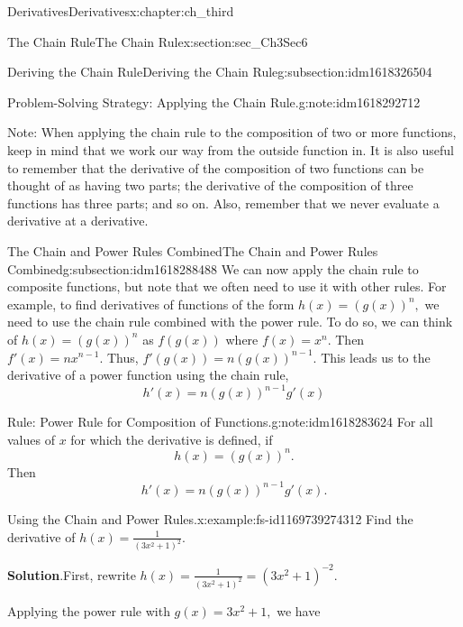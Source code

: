 \documentclass[oneside,10pt,]{book}
\newcommand{\blocktitlefont}{\relax}
\numberwithin{equation}{section}
\begin{document}
\begin{chapterptx}{Derivatives}{}{Derivatives}{}{}{x:chapter:ch_third}
\begin{sectionptx}{The Chain Rule}{}{The Chain Rule}{}{}{x:section:sec_Ch3Sec6}
\begin{subsectionptx}{Deriving the Chain Rule}{}{Deriving the Chain Rule}{}{}{g:subsection:idm1618326504}
\begin{note}{Problem-Solving Strategy: Applying the Chain Rule.}{g:note:idm1618292712}
\begin{enumerate}
\end{enumerate}
Note: When applying the chain rule to the composition of two or more functions, keep in mind that we work our way from the outside function in. It is also useful to remember that the derivative of the composition of two functions can be thought of as having two parts; the derivative of the composition of three functions has three parts; and so on. Also, remember that we never evaluate a derivative at a derivative.%
\end{note}
\end{subsectionptx}
%
%
\typeout{************************************************}
\typeout{************************************************}
%
\begin{subsectionptx}{The Chain and Power Rules Combined}{}{The Chain and Power Rules Combined}{}{}{g:subsection:idm1618288488}
We can now apply the chain rule to composite functions, but note that we often need to use it with other rules. For example, to find derivatives of functions of the form \(h(x)=(g(x))^n ,\) we need to use the chain rule combined with the power rule. To do so, we can think of \(h(x)=(g(x))^n \) as \(f(g(x))\) where \(f(x)=x^n.\) Then \(f'(x)=nx^{n-1}.\) Thus, \(f'(g(x))=n(g(x))^{n-1}.\) This leads us to the derivative of a power function using the chain rule,%
%
\begin{equation*}
h'(x)=n(g(x))^{n-1}g'(x)
\end{equation*}
\begin{note}{Rule: Power Rule for Composition of Functions.}{g:note:idm1618283624}%
For all values of \(x\) for which the derivative is defined, if%
%
\begin{equation*}
h(x)=(g(x))^n .
\end{equation*}
Then%
%
\begin{equation}
h'(x)=n(g(x))^{n-1}g'(x).\label{x:men:fs-id1169739222795}
\end{equation}
\end{note}
\begin{example}{Using the Chain and Power Rules.}{x:example:fs-id1169739274312}%
Find the derivative of \(h(x)=\frac{1}{(3x^2+1)^2}.\)%
\par\smallskip%
\noindent\textbf{\blocktitlefont Solution}.\hypertarget{g:solution:idm1618282344}{}\quad{}First, rewrite \(h(x)=\frac{1}{(3x^2+1)^2}=(3x^2+1)^{-2}.\)%
\par
Applying the power rule with \(g(x)=3x^2+1,\) we have%
%
\begin{equation*}

\end{equation*}
\end{example}
\end{subsectionptx}
\end{sectionptx}
\end{chapterptx}
\end{document}

